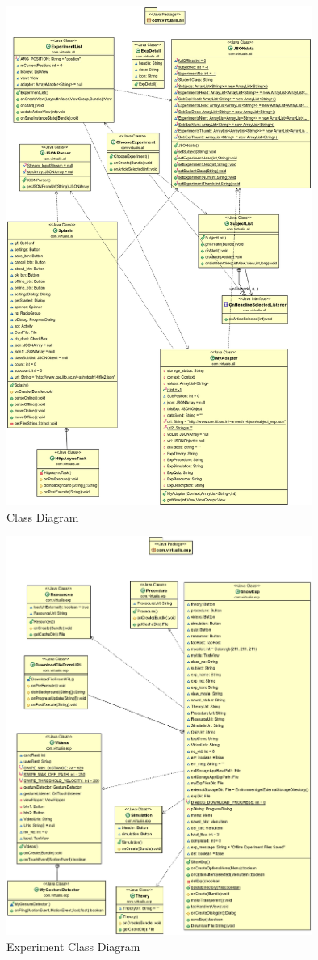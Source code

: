 \documentclass[12pt]{report}
\begin{document}
\begin{figure}[H]
 \centering
 \includegraphics[width=10cm]{./class_all.png}
 \caption{Class Diagram\label{fig:class_all}}
\end{figure}

\begin{figure}[H]
 \centering
 \includegraphics[width=10cm]{./class_exp.png}
 \caption{Experiment Class Diagram\label{fig:class_exp}}
\end{figure}
\end{document}
